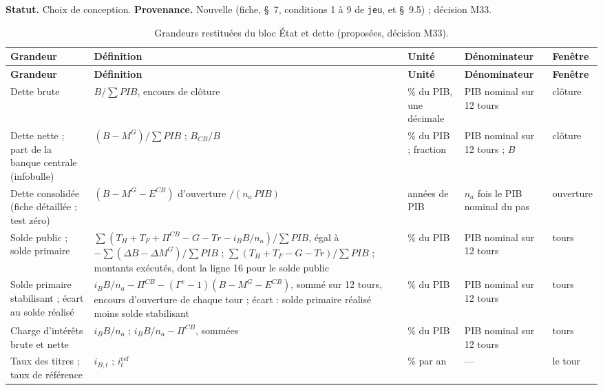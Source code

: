 \documentclass[11pt,a4paper]{article}
\begin{document}
\begin{proposee}
\textbf{Statut.} Choix de conception. \textbf{Provenance.} Nouvelle (fiche, \S~7, conditions 1 à 9 de \texttt{jeu}, et \S~9.5) ; décision M33.
\end{proposee}

\begin{center}\small
\setlength{\tabcolsep}{4pt}
\begin{longtable}{>{\raggedright\arraybackslash}p{2.8cm}>{\raggedright\arraybackslash}p{4.7cm}>{\raggedright\arraybackslash}p{1.8cm}>{\raggedright\arraybackslash}p{2.6cm}>{\raggedright\arraybackslash}p{2.5cm}}
\caption{Grandeurs restituées du bloc État et dette (proposées, décision M33).}\label{tab:finances_publiques-restitution}\\
\toprule
\textbf{Grandeur} & \textbf{Définition} & \textbf{Unité} & \textbf{Dénominateur} & \textbf{Fenêtre}\\
\midrule
\endfirsthead
\toprule
\textbf{Grandeur} & \textbf{Définition} & \textbf{Unité} & \textbf{Dénominateur} & \textbf{Fenêtre}\\
\midrule
\endhead
Dette brute & $B/\sum \mathit{PIB}$, encours de clôture & \% du PIB, une décimale & PIB nominal sur 12 tours & clôture\\
Dette nette ; part de la banque centrale (infobulle) & $(B - M^G)/\sum \mathit{PIB}$ ; $B_{\mathit{CB}}/B$ & \% du PIB ; fraction & PIB nominal sur 12 tours ; $B$ & clôture\\
Dette consolidée (fiche détaillée ; test zéro) & $(B - M^G - E^{\mathit{CB}})$ d'ouverture $/(n_a\,\mathit{PIB})$ & années de PIB & $n_a$ fois le PIB nominal du pas & ouverture\\
Solde public ; solde primaire & $\sum(T_H + T_F + \Pi^{\mathit{CB}} - G - \mathit{Tr} - i_B B/n_a)/\sum\mathit{PIB}$, égal à $-\sum(\Delta B - \Delta M^G)/\sum\mathit{PIB}$ ; $\sum(T_H + T_F - G - \mathit{Tr})/\sum\mathit{PIB}$ ; montants exécutés, dont la ligne 16 pour le solde public & \% du PIB & PIB nominal sur 12 tours & 12 tours\\
Solde primaire stabilisant ; écart au solde réalisé & $i_B B/n_a - \Pi^{\mathit{CB}} - (\Gamma^e - 1)(B - M^G - E^{\mathit{CB}})$, sommé sur 12 tours, encours d'ouverture de chaque tour ; écart : solde primaire réalisé moins solde stabilisant & \% du PIB & PIB nominal sur 12 tours & 12 tours\\
Charge d'intérêts brute et nette & $i_B B/n_a$ ; $i_B B/n_a - \Pi^{\mathit{CB}}$, sommées & \% du PIB & PIB nominal sur 12 tours & 12 tours\\
Taux des titres ; taux de référence & $i_{B,t}$ ; $i^{\mathrm{ref}}_t$ & \% par an & --- & le tour\\

\end{longtable}
\end{center}
\end{document}

